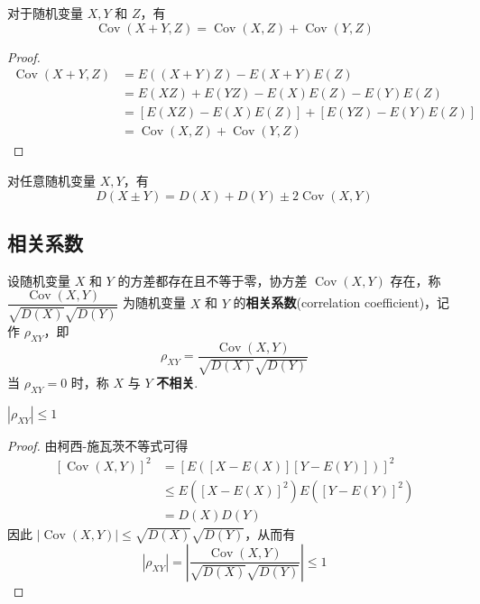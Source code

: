 \begin{property}
    对于随机变量 $X,Y$ 和 $Z$，有
    $$
    \operatorname{Cov}(X+Y,Z) = \operatorname{Cov}(X,Z) + \operatorname{Cov}(Y,Z)
    $$
\end{property}

\begin{proof}
    $$
    \begin{aligned}
        \operatorname{Cov}(X+Y,Z) &= E((X+Y)Z) - E(X+Y) E(Z) \\
        &= E(XZ) + E(YZ) - E(X) E(Z) - E(Y) E(Z) \\
        &= [E(XZ) - E(X) E(Z)] + [E(YZ) - E(Y) E(Z)] \\
        &= \operatorname{Cov}(X,Z) + \operatorname{Cov}(Y,Z)
    \end{aligned}
    $$
\end{proof}

\begin{property}
    对任意随机变量 $X,Y$，有
    $$
    D(X \pm Y) = D(X) + D(Y) \pm 2 \operatorname{Cov}(X,Y)
    $$
\end{property}

\subsection{相关系数}

\begin{definition}
    设随机变量 $X$ 和 $Y$ 的方差都存在且不等于零，协方差 $\operatorname{Cov}(X,Y)$ 存在，称 $\dfrac{\operatorname{Cov}(X,Y)}{\sqrt{D(X)} \sqrt{D(Y)}}$ 为随机变量 $X$ 和 $Y$ 的\textbf{相关系数}(correlation coefficient)，记作 $\rho_{XY}$，即
    $$
    \rho_{XY} = \dfrac{\operatorname{Cov}(X,Y)}{\sqrt{D(X)} \sqrt{D(Y)}}
    $$
    当 $\rho_{XY} = 0$ 时，称 $X$ 与 $Y$ \textbf{不相关}.
\end{definition}

\begin{property}
    $|\rho_{XY}| \leqslant 1$
\end{property}

\vspace{-1.5em}

\begin{proof}
    由柯西-施瓦茨不等式可得
    $$
    \begin{aligned}
        \left[ \operatorname{Cov}(X,Y) \right]^2 &= [E([X-E(X)][Y-E(Y)])]^2 \\
        & \leqslant E([X-E(X)]^2) E([Y-E(Y)]^2) \\
        &= D(X) D(Y)
    \end{aligned}
    $$
    因此 $|\operatorname{Cov}(X,Y)| \leqslant \sqrt{D(X)} \sqrt{D(Y)}$，从而有
    $$
    |\rho_{XY}| = \left| \dfrac{\operatorname{Cov}(X,Y)}{\sqrt{D(X)} \sqrt{D(Y)}} \right| \leqslant 1
    $$

    \vspace{-2.3em}
\end{proof}

